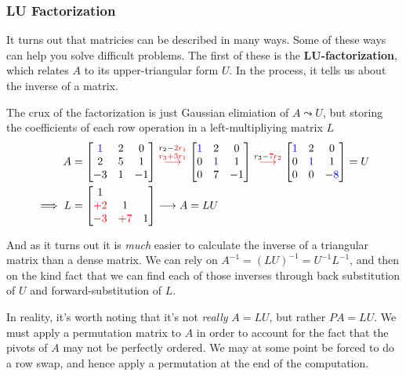 \documentclass[11pt]{article}
\begin{document}
	\subsubsection*{LU Factorization}
\item It turns out that matricies can be described in many ways. Some of these ways can help you solve difficult problems. The first of these is the $\bm{LU}$\textbf{-factorization}, which relates $A$ to its upper-triangular form $U$. In the process, it tells us about the inverse of a matrix. 
\item The crux of the factorization is just Gaussian elimiation of $A \leadsto U$, but storing the coefficients of each row operation in a left-multipliying matrix $L$ 
\begin{align}
	A &= \begin{bmatrix} \color{blue}{1} & 2 & 0 \\ 2 & 5 & 1 \\ -3 & 1 & -1 \end{bmatrix} \stackrel{r_2 - \color{red}{2}r_1}{\stackrel{r_3 + {\color{red}{3}}r_1}{\longrightarrow}}
    \begin{bmatrix} \color{blue}{1} & 2 & 0 \\ 0 & \color{blue}{1} & 1 \\  0 & 7 & -1 \end{bmatrix} \stackrel{r_3 - \color{red}{7}r_2}{\longrightarrow}
    \begin{bmatrix} \color{blue}{1} & 2 & 0 \\ 0 & \color{blue}{1} & 1 \\  0 & 0 & \color{blue}{-8} \end{bmatrix} = U  \\
	\implies L &= \begin{bmatrix} 1 & & \\ \color{red}{+2} & 1 & \\ \color{red}{-3} & \color{red}{+7} & 1 \end{bmatrix}
	\longrightarrow A = LU
\end{align} 
\item And as it turns out it is \textit{much} easier to calculate the inverse of a triangular matrix than a dense matrix. We can rely on $A^{-1} = (LU)^{-1} = U^{-1}L^{-1}$, and then on the kind fact that we can find each of those inverses through back substitution of $U$ and forward-substitution of $L$.
\item In reality, it's worth noting that it's not \textit{really} $A=LU$, but rather $PA=LU$. We must apply a permutation matrix to $A$ in order to account for the fact that the pivots of $A$ may not be perfectly ordered. We may at some point be forced to do a row swap, and hence apply a permutation at the end of the computation.
\end{document}
